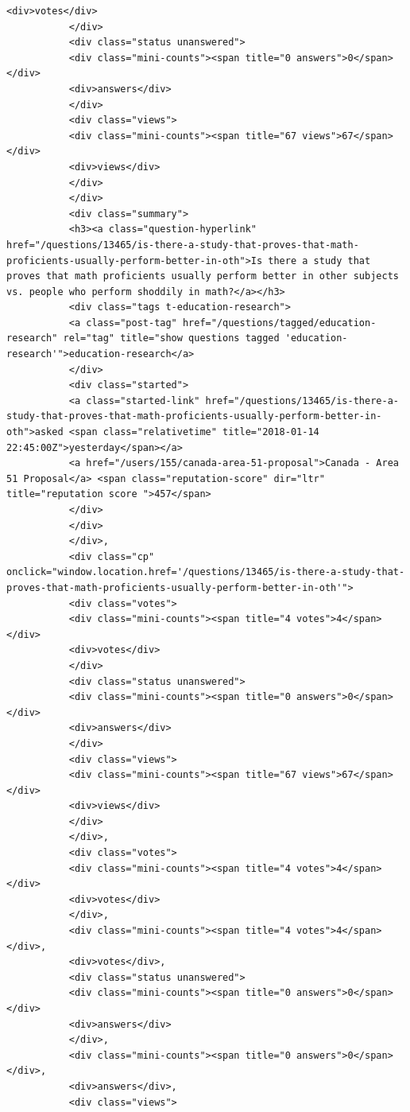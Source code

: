 \documentclass[11pt]{article}
\begin{document}
\begin{Verbatim}[commandchars=\\\{\}]
           <div>votes</div>
           </div>
           <div class="status unanswered">
           <div class="mini-counts"><span title="0 answers">0</span></div>
           <div>answers</div>
           </div>
           <div class="views">
           <div class="mini-counts"><span title="67 views">67</span></div>
           <div>views</div>
           </div>
           </div>
           <div class="summary">
           <h3><a class="question-hyperlink" href="/questions/13465/is-there-a-study-that-proves-that-math-proficients-usually-perform-better-in-oth">Is there a study that proves that math proficients usually perform better in other subjects vs. people who perform shoddily in math?</a></h3>
           <div class="tags t-education-research">
           <a class="post-tag" href="/questions/tagged/education-research" rel="tag" title="show questions tagged 'education-research'">education-research</a>
           </div>
           <div class="started">
           <a class="started-link" href="/questions/13465/is-there-a-study-that-proves-that-math-proficients-usually-perform-better-in-oth">asked <span class="relativetime" title="2018-01-14 22:45:00Z">yesterday</span></a>
           <a href="/users/155/canada-area-51-proposal">Canada - Area 51 Proposal</a> <span class="reputation-score" dir="ltr" title="reputation score ">457</span>
           </div>
           </div>
           </div>,
           <div class="cp" onclick="window.location.href='/questions/13465/is-there-a-study-that-proves-that-math-proficients-usually-perform-better-in-oth'">
           <div class="votes">
           <div class="mini-counts"><span title="4 votes">4</span></div>
           <div>votes</div>
           </div>
           <div class="status unanswered">
           <div class="mini-counts"><span title="0 answers">0</span></div>
           <div>answers</div>
           </div>
           <div class="views">
           <div class="mini-counts"><span title="67 views">67</span></div>
           <div>views</div>
           </div>
           </div>,
           <div class="votes">
           <div class="mini-counts"><span title="4 votes">4</span></div>
           <div>votes</div>
           </div>,
           <div class="mini-counts"><span title="4 votes">4</span></div>,
           <div>votes</div>,
           <div class="status unanswered">
           <div class="mini-counts"><span title="0 answers">0</span></div>
           <div>answers</div>
           </div>,
           <div class="mini-counts"><span title="0 answers">0</span></div>,
           <div>answers</div>,
           <div class="views">

\end{Verbatim}
\end{document}
